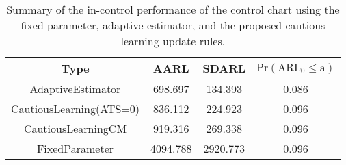 \begin{table}[!h]

\caption{Summary of the in-control performance of the control chart using the fixed-parameter, adaptive estimator, and the proposed cautious learning update rules.}
\centering
\begin{tabular}[t]{cccc}
\toprule
Type & AARL & SDARL & $\text{Pr}(\text{ARL}_0 \leq \text{a})$\\
\midrule
AdaptiveEstimator & 698.697 & 134.393 & 0.086\\
CautiousLearning(ATS=0) & 836.112 & 224.923 & 0.096\\
CautiousLearningCM & 919.316 & 269.338 & 0.096\\
FixedParameter & 4094.788 & 2920.773 & 0.096\\
\bottomrule
\end{tabular}
\end{table}
